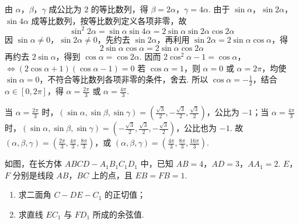 \begin{solution}
由 \(\alpha\)，\(\beta\)，\(\gamma\) 成公比为 \(2\) 的等比数列，得 \(\beta=2\alpha\)，\(\gamma=4\alpha\). 由于 \(\sin\alpha\)，\(\sin2\alpha\)，\(\sin4\alpha\) 成等比数列，按等比数列定义各项非零，故
\[
\sin^2 2\alpha=\sin\alpha\sin4\alpha=2\sin\alpha\sin2\alpha\cos2\alpha
\]
因 \(\sin\alpha\ne0\)，\(\sin2\alpha\ne0\)，先约去 \(\sin2\alpha\)，再利用 \(\sin2\alpha=2\sin\alpha\cos\alpha\)，得
\[
2\sin\alpha\cos\alpha=2\sin\alpha\cos2\alpha
\]
再约去 \(2\sin\alpha\)，得到 \(\cos\alpha=\cos2\alpha\). 因而
\(2\cos^2\alpha-1=\cos\alpha\)，\(\Longleftrightarrow (2\cos\alpha+1)(\cos\alpha-1)=0\)
若 \(\cos\alpha=1\)，则 \(\alpha=0\) 或 \(\alpha=2\pi\)，均使 \(\sin\alpha=0\)，不符合等比数列各项非零的条件，舍去. 所以 \(\cos\alpha=-\frac12\)，结合 \(\alpha\in[0,2\pi]\)，得 \(\alpha=\frac{2\pi}{3}\) 或 \(\alpha=\frac{4\pi}{3}\).

当 \(\alpha=\frac{2\pi}{3}\) 时，\((\sin\alpha,\sin\beta,\sin\gamma)=\left(\frac{\sqrt3}{2},-\frac{\sqrt3}{2},\frac{\sqrt3}{2}\right)\)，公比为 \(-1\)；当 \(\alpha=\frac{4\pi}{3}\) 时，\((\sin\alpha,\sin\beta,\sin\gamma)=\left(-\frac{\sqrt3}{2},\frac{\sqrt3}{2},-\frac{\sqrt3}{2}\right)\)，公比也为 \(-1\). 故
\(\left(\alpha,\beta,\gamma\right)=\left(\frac{2\pi}{3},\frac{4\pi}{3},\frac{8\pi}{3}\right)\)，或 \(\left(\alpha,\beta,\gamma\right)=\left(\frac{4\pi}{3},\frac{8\pi}{3},\frac{16\pi}{3}\right)\).
\end{solution}

\begin{problem}
如图，在长方体 \(ABCD - A_{1}B_{1}C_{1}D_{1}\) 中，已知 \(AB = 4\)，\(AD = 3\)，\(AA_{1} = 2\). \(E\)，\(F\) 分别是线段 \(AB\)，\(BC\) 上的点，且 \(EB = FB = 1\).

\begin{enumerate}
\item 求二面角 \(C - DE - C_1\) 的正切值；
\item 求直线 \(EC_1\) 与 \(FD_1\) 所成的余弦值.
\end{enumerate}

\end{problem}

